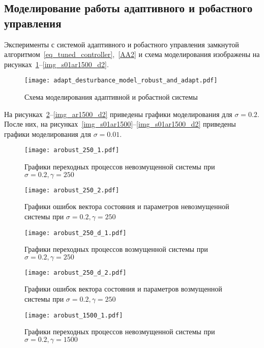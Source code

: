\clearpage
\newpage
\subsection{Моделирование работы адаптивного и робастного управления}
Эксперименты с системой адаптивного и робастного управления замкнутой алгоритмом~\ref{eq_tuned_controller},~\ref{AA2} и схема моделирования изображены на рисунках~\ref{img_adapt_and_robust_model}--\ref{img_s01ar1500_d2}.

\begin{figure}[h!]
	\centering
	\texttt{[image: adapt\_desturbance\_model\_robust\_and\_adapt.pdf]}
	\caption{Схема моделирования адаптивной и робастной системы}
	\label{img_adapt_and_robust_model}
\end{figure}

На рисунках~\ref{img_ar250}--\ref{img_ar1500_d2} приведены графики моделирования для $\sigma = 0.2$. После них, на рисунках~\ref{img_s01ar1500}--\ref{img_s01ar1500_d2} приведены графики моделирования для $\sigma = 0.01$.

\begin{figure}[h!]
	\centering
	\texttt{[image: arobust\_250\_1.pdf]}
	\caption{Графики переходных процессов невозмущенной системы при $\sigma = 0.2, \gamma = 250$}
	\label{img_ar250}
\end{figure}

\begin{figure}[h!]
	\centering
	\texttt{[image: arobust\_250\_2.pdf]}
	\caption{Графики ошибок вектора состояния и параметров невозмущенной системы при $\sigma = 0.2, \gamma = 250$}
	\label{img_ar250_2}
\end{figure}

\begin{figure}[h!]
	\centering
	\texttt{[image: arobust\_250\_d\_1.pdf]}
	\caption{Графики переходных процессов возмущенной системы при $\sigma = 0.2, \gamma = 250$}
	\label{img_ar250d}
\end{figure}

\begin{figure}[h!]
	\centering
	\texttt{[image: arobust\_250\_d\_2.pdf]}
	\caption{Графики ошибок вектора состояния и параметров возмущенной системы при $\sigma = 0.2, \gamma = 250$}
	\label{img_ar250_d2}
\end{figure}

\begin{figure}[h!]
	\centering
	\texttt{[image: arobust\_1500\_1.pdf]}
	\caption{Графики переходных процессов невозмущенной системы при $\sigma = 0.2, \gamma = 1500$}
	\label{img_ar1500}
\end{figure}

